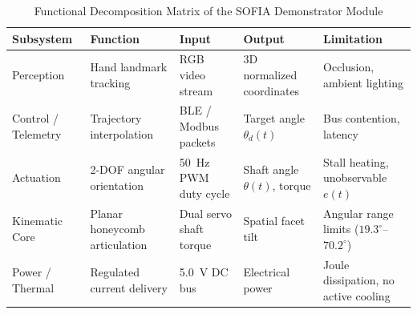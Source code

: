 \documentclass[lettersize,journal]{IEEEtran}
\begin{document}
	\begin{table}[!t]
		\centering
		\caption{Functional Decomposition Matrix of the SOFIA Demonstrator Module}
		\label{tab:functional_matrix}
		\scriptsize
		\setlength{\tabcolsep}{2pt}
		\renewcommand{\arraystretch}{0.92}
		\begin{tabular}{@{}p{1.2cm} p{1.8cm} p{1.35cm} p{1.45cm} p{1.85cm}@{}}
			\toprule
			\textbf{Subsystem} & \textbf{Function} & \textbf{Input} & \textbf{Output} & \textbf{Limitation} \\
			\midrule
			Perception & Hand landmark tracking & RGB video stream & 3D normalized coordinates & Occlusion, ambient lighting \\
			Control / Telemetry & Trajectory interpolation & BLE / Modbus packets & Target angle $\theta_d(t)$ & Bus contention, latency \\
			Actuation & 2-DOF angular orientation & 50~Hz PWM duty cycle & Shaft angle $\theta(t)$, torque & Stall heating, unobservable $e(t)$ \\
			Kinematic Core & Planar honeycomb articulation & Dual servo shaft torque & Spatial facet tilt & Angular range limits ($19.3^\circ$--$70.2^\circ$) \\
			Power / Thermal & Regulated current delivery & 5.0~V DC bus & Electrical power & Joule dissipation, no active cooling \\
			\bottomrule
		\end{tabular}
	\end{table}
	
\end{document}
